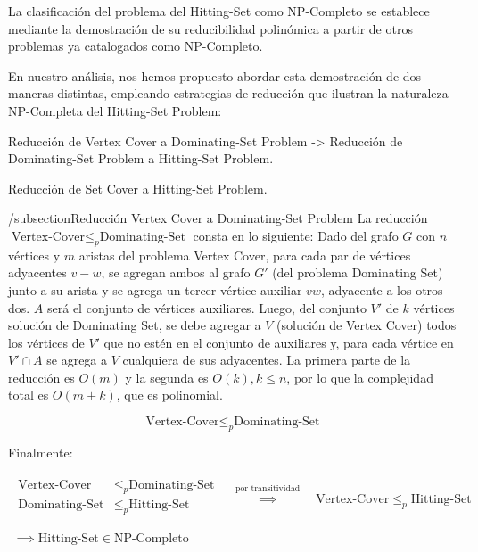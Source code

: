 La clasificación del problema del Hitting-Set como NP-Completo se establece mediante la demostración
de su reducibilidad polinómica a partir de otros problemas ya catalogados como NP-Completo. 

En nuestro análisis, nos hemos propuesto abordar esta demostración de dos maneras distintas, 
empleando estrategias de reducción que ilustran la naturaleza NP-Completa del Hitting-Set Problem:

\item Reducción de Vertex Cover a Dominating-Set Problem -> Reducción de Dominating-Set Problem a Hitting-Set Problem.
\item Reducción de Set Cover a Hitting-Set Problem.


/subsection{Reducción Vertex Cover a Dominating-Set Problem}
La reducción $\text{Vertex-Cover} \leq _{p} \text{Dominating-Set}$ consta en lo siguiente:
Dado del grafo $G$ con $n$ vértices y $m$ aristas del problema Vertex Cover, para cada par de 
vértices adyacentes $v-w$, se agregan ambos al grafo $G'$ (del problema Dominating Set) junto a 
su arista y se agrega un tercer vértice auxiliar $vw$, adyacente a los otros dos. $A$ será el 
conjunto de vértices auxiliares. Luego, del conjunto $V'$ de $k$ vértices solución de 
Dominating Set, se debe agregar a $V$ (solución de Vertex Cover) todos los vértices de $V'$ que 
no estén en el conjunto de auxiliares y, para cada vértice en $V' \cap A$ se agrega a $V$ 
cualquiera de sus adyacentes. La primera parte de la reducción es $O(m)$ y la segunda es 
$O(k),k \leq n$, por lo que la complejidad total es $O(m+k)$, que es polinomial.

\[\text{Vertex-Cover} \leq _{p} \text{Dominating-Set}\]


Finalmente:

\[
    \begin{array}{c}
        \begin{split}
            \text{Vertex-Cover}  & \leq _{p} \text{Dominating-Set} \\
            \text{Dominating-Set}  & \leq _{p} \text{Hitting-Set} \\
        \end{split}
        \quad \overset{ \text{por transitividad} }{ \implies  } \quad
        \text{Vertex-Cover}  \leq _{p} \text{Hitting-Set} \\ \\
        \implies \text{Hitting-Set} \in \text{NP-Completo}    
    \end{array}
\]



